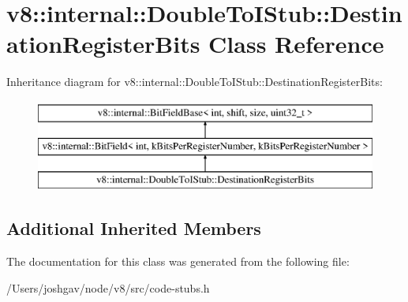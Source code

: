 \hypertarget{classv8_1_1internal_1_1_double_to_i_stub_1_1_destination_register_bits}{}\section{v8\+:\+:internal\+:\+:Double\+To\+I\+Stub\+:\+:Destination\+Register\+Bits Class Reference}
\label{classv8_1_1internal_1_1_double_to_i_stub_1_1_destination_register_bits}
Inheritance diagram for v8\+:\+:internal\+:\+:Double\+To\+I\+Stub\+:\+:Destination\+Register\+Bits\+:\begin{figure}[H]
\begin{center}
\leavevmode
\includegraphics[height=3.000000cm]{classv8_1_1internal_1_1_double_to_i_stub_1_1_destination_register_bits}
\end{center}
\end{figure}
\subsection*{Additional Inherited Members}


The documentation for this class was generated from the following file\+:\begin{DoxyCompactItemize}
\item 
/\+Users/joshgav/node/v8/src/code-\/stubs.\+h\end{DoxyCompactItemize}
